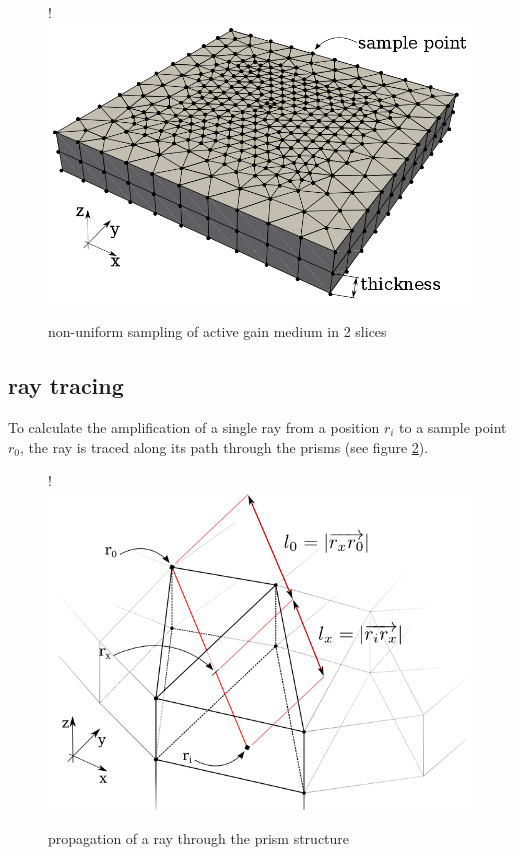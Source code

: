 \begin{figure}
  \centerline{
     {!} {\includegraphics{graphics/samples_reduced.png}}
  }
  \caption{non-uniform sampling of active gain medium in 2 slices}
  \label{graphic:samples_reduced}
\end{figure}




\subsection{ray tracing}
\label{subsec:raytracing}

To calculate the amplification of a single ray from a position $r_i$ to a sample
point $r_0$, the ray is traced along its path through the prisms (see figure
\ref{graphic:prism_propagation}). 

\begin{figure}[H]
  \centerline{
     {!} {\includegraphics{./graphics/prism_propagation_2.png}}
  }
  \caption{propagation of a ray through the prism structure}
  \label{graphic:prism_propagation}
\end{figure}

